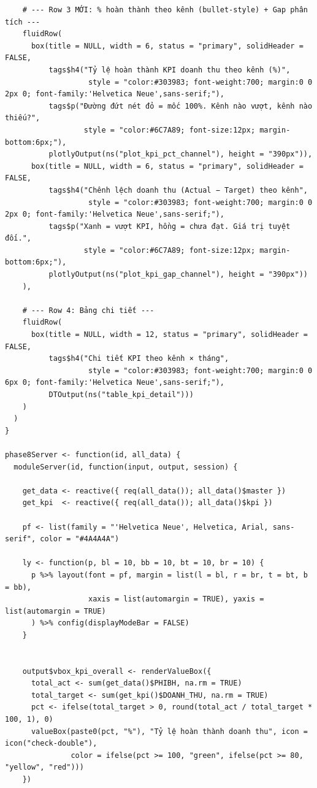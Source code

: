 \documentclass[12pt, a4paper]{article}
\begin{document}
\begin{lstlisting}
    # --- Row 3 MỚI: % hoàn thành theo kênh (bullet-style) + Gap phân tích ---
    fluidRow(
      box(title = NULL, width = 6, status = "primary", solidHeader = FALSE,
          tags$h4("Tỷ lệ hoàn thành KPI doanh thu theo kênh (%)",
                   style = "color:#303983; font-weight:700; margin:0 0 2px 0; font-family:'Helvetica Neue',sans-serif;"),
          tags$p("Đường đứt nét đỏ = mốc 100%. Kênh nào vượt, kênh nào thiếu?",
                  style = "color:#6C7A89; font-size:12px; margin-bottom:6px;"),
          plotlyOutput(ns("plot_kpi_pct_channel"), height = "390px")),
      box(title = NULL, width = 6, status = "primary", solidHeader = FALSE,
          tags$h4("Chênh lệch doanh thu (Actual − Target) theo kênh",
                   style = "color:#303983; font-weight:700; margin:0 0 2px 0; font-family:'Helvetica Neue',sans-serif;"),
          tags$p("Xanh = vượt KPI, hồng = chưa đạt. Giá trị tuyệt đối.",
                  style = "color:#6C7A89; font-size:12px; margin-bottom:6px;"),
          plotlyOutput(ns("plot_kpi_gap_channel"), height = "390px"))
    ),

    # --- Row 4: Bảng chi tiết ---
    fluidRow(
      box(title = NULL, width = 12, status = "primary", solidHeader = FALSE,
          tags$h4("Chi tiết KPI theo kênh × tháng",
                   style = "color:#303983; font-weight:700; margin:0 0 6px 0; font-family:'Helvetica Neue',sans-serif;"),
          DTOutput(ns("table_kpi_detail")))
    )
  )
}

phase8Server <- function(id, all_data) {
  moduleServer(id, function(input, output, session) {

    get_data <- reactive({ req(all_data()); all_data()$master })
    get_kpi  <- reactive({ req(all_data()); all_data()$kpi })

    pf <- list(family = "'Helvetica Neue', Helvetica, Arial, sans-serif", color = "#4A4A4A")

    ly <- function(p, bl = 10, bb = 10, bt = 10, br = 10) {
      p %>% layout(font = pf, margin = list(l = bl, r = br, t = bt, b = bb),
                   xaxis = list(automargin = TRUE), yaxis = list(automargin = TRUE)
      ) %>% config(displayModeBar = FALSE)
    }

 
    output$vbox_kpi_overall <- renderValueBox({
      total_act <- sum(get_data()$PHIBH, na.rm = TRUE)
      total_target <- sum(get_kpi()$DOANH_THU, na.rm = TRUE)
      pct <- ifelse(total_target > 0, round(total_act / total_target * 100, 1), 0)
      valueBox(paste0(pct, "%"), "Tỷ lệ hoàn thành doanh thu", icon = icon("check-double"),
               color = ifelse(pct >= 100, "green", ifelse(pct >= 80, "yellow", "red")))
    })


\end{lstlisting}
\end{document}
